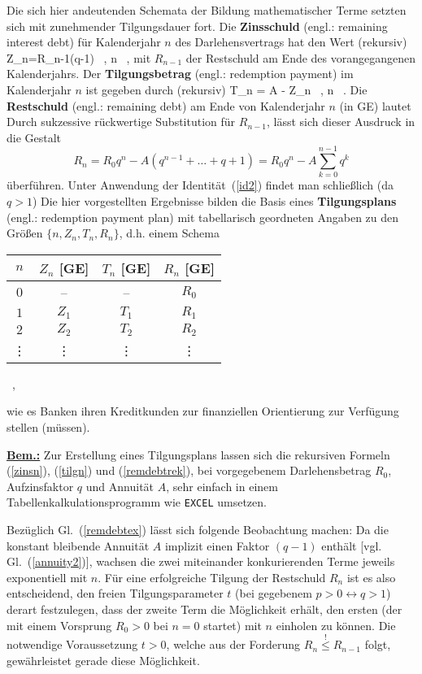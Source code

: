 %
Die sich hier andeutenden Schemata der Bildung
mathematischer Terme setzten sich mit zunehmender
Tilgungsdauer fort. Die {\bf Zinsschuld} (engl.: remaining 
interest debt) f\"ur Kalenderjahr $n$ des Darlehensvertrags hat den
Wert (rekursiv)
%
\be
{}
Z_{n}=R_{n-1}(q-1) \ , \quad n\in{} \ ,
\ee
%
mit $R_{n-1}$ der Restschuld am Ende des vorangegangenen
Kalenderjahrs. Der {\bf Tilgungsbetrag} (engl.: redemption 
payment) im Kalenderjahr $n$ ist gegeben durch (rekursiv)
%
\be
{}
T_{n} = A - Z_{n} \ , \quad n\in{} \ .
\ee
%
Die {\bf Restschuld} (engl.: remaining debt) am Ende von 
Kalenderjahr $n$ (in GE) lautet
%
\be
{}
\ee
%
Durch sukzessive r\"uckwertige Substitution f\"ur $R_{n-1}$, 
l\"asst sich dieser Ausdruck in die Gestalt
%
\[
R_{n} = R_{0}q^{n}-A(q^{n-1}+\ldots+q+1)
= R_{0}q^{n}-A\sum_{k=0}^{n-1}q^{k} 
\]
%
\"uberf\"uhren. Unter Anwendung der Identit\"at~(\ref{id2})
findet man schlie\ss lich (da $q>1$)
%
\be
{}
\ee
%
Die hier vorgestellten Ergebnisse bilden die Basis
eines {\bf Tilgungsplans} (engl.: redemption payment plan) 
mit tabellarisch geordneten Angaben zu den Gr\"o\ss en $\{n, Z_{n}, 
T_{n}, R_{n}\}$, d.h. einem Schema
%
\begin{center}
		\begin{tabular}{c||c|c|c}
		$n$ & $Z_{n}$ [GE] & $T_{n}$ [GE] & $R_{n}$ [GE] \\
		\hline\hline
		$0$ & -- & -- & $R_{0}$ \\
		$1$ & $Z_{1}$ & $T_{1}$ & $R_{1}$ \\
		$2$ & $Z_{2}$ & $T_{2}$ & $R_{2}$ \\
		\vdots & \vdots & \vdots & \vdots
		\end{tabular} \ ,
\end{center}
%
wie es Banken ihren Kreditkunden zur finanziellen
Orientierung zur Verf\"ugung stellen (m\"ussen).

\medskip
\noindent
\underline{\bf Bem.:} Zur Erstellung eines Tilgungsplans lassen
sich die rekursiven Formeln (\ref{zinsn}), (\ref{tilgn}) und
(\ref{remdebtrek}), bei vorgegebenem Darlehensbetrag $R_{0}$,
Aufzinsfaktor $q$ und Annuit\"at $A$, sehr einfach in einem
Tabellenkalkulationsprogramm wie {\tt EXCEL} umsetzen.

\medskip
\noindent
Bez\"uglich Gl.~(\ref{remdebtex}) l\"asst sich folgende
Beobachtung machen: Da die konstant bleibende Annuit\"at $A$
implizit einen Faktor $(q-1)$ enth\"alt [vgl. Gl.~(\ref{annuity2})],
wachsen die zwei miteinander konkurierenden Terme  jeweils
exponentiell mit $n$. F\"ur eine erfolgreiche Tilgung der
Restschuld $R_{n}$ ist es also entscheidend, den freien
Tilgungsparameter $t$ (bei gegebenem $p>0 \leftrightarrow
q>1$) derart festzulegen, dass der zweite Term die M\"oglichkeit
erh\"alt, den ersten (der mit einem Vorsprung $R_{0}>0$
bei $n=0$ startet) mit $n$ einholen zu k\"onnen. Die notwendige
Voraussetzung $t>0$, welche aus der Forderung $R_{n}
\stackrel{!}{\leq} R_{n-1}$ folgt, gew\"ahrleistet gerade
diese M\"oglichkeit.

